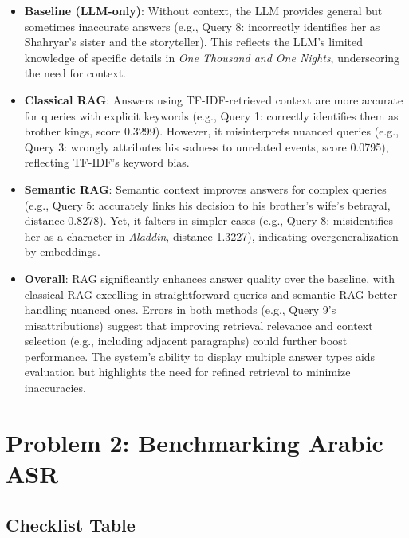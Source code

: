 \documentclass[12pt]{article}
\begin{document}
\begin{itemize}
    \item \textbf{Baseline (LLM-only)}: Without context, the LLM provides general but sometimes inaccurate answers (e.g., Query 8: \arabicfont {} incorrectly identifies her as Shahryar’s sister and the storyteller). This reflects the LLM’s limited knowledge of specific details in \textit{One Thousand and One Nights}, underscoring the need for context.

    \item \textbf{Classical RAG}: Answers using TF-IDF-retrieved context are more accurate for queries with explicit keywords (e.g., Query 1: \arabicfont {} correctly identifies them as brother kings, score 0.3299). However, it misinterprets nuanced queries (e.g., Query 3: \arabicfont {} wrongly attributes his sadness to unrelated events, score 0.0795), reflecting TF-IDF’s keyword bias.

    \item \textbf{Semantic RAG}: Semantic context improves answers for complex queries (e.g., Query 5: \arabicfont {} accurately links his decision to his brother's wife’s betrayal, distance 0.8278). Yet, it falters in simpler cases (e.g., Query 8: \arabicfont {} misidentifies her as a character in \textit{Aladdin}, distance 1.3227), indicating overgeneralization by embeddings.

    \item \textbf{Overall}: RAG significantly enhances answer quality over the baseline, with classical RAG excelling in straightforward queries and semantic RAG better handling nuanced ones. Errors in both methods (e.g., Query 9’s misattributions) suggest that improving retrieval relevance and context selection (e.g., including adjacent paragraphs) could further boost performance. The system’s ability to display multiple answer types aids evaluation but highlights the need for refined retrieval to minimize inaccuracies.
\end{itemize}


\section{Problem 2: Benchmarking Arabic ASR}
\subsection{Checklist Table}
\end{document}
